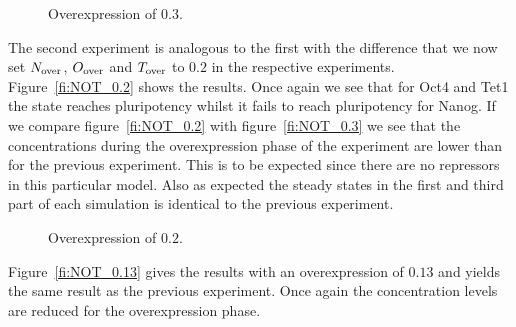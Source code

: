 \begin{figure}
\centering
\begin{minipage}[t]{0.3\textwidth}
\centering
\graphicspath{{../Plots/}}

\end{minipage}
\hfill
\begin{minipage}[t]{0.3\textwidth}
\centering
\graphicspath{{../Plots/}}

\end{minipage}
\hspace*{0.2cm}
\begin{minipage}[t]{0.3\textwidth}
\centering
\graphicspath{{../Plots/}}

\end{minipage}
\caption{Overexpression of $0.3$.}
\label{pl:NOT_0.3}
\end{figure}

The second experiment is analogous to the first with the difference that we now set
$N_\text{over}$, $O_\text{over}$ and $T_\text{over}$ to $0.2$ in the respective experiments. Figure~\ref{fi:NOT_0.2} 
shows the results. Once again we see that
for Oct4 and Tet1 the state reaches pluripotency whilst it fails to reach pluripotency for Nanog.
If we compare figure~\ref{fi:NOT_0.2} with figure~\ref{fi:NOT_0.3} we see that the concentrations
during the overexpression phase of the experiment are lower than for the previous experiment.
This is to be expected since there are no repressors in this particular model.
Also as expected the steady states in the first and third part of each simulation is identical to
the previous experiment.

\begin{figure}
\centering
\begin{minipage}[t]{0.3\textwidth}
\centering
\graphicspath{{../Plots/}}

\end{minipage}
\hfill
\begin{minipage}[t]{0.3\textwidth}
\centering
\graphicspath{{../Plots/}}

\end{minipage}
\hspace*{0.2cm}
\begin{minipage}[t]{0.3\textwidth}
\centering
\graphicspath{{../Plots/}}

\end{minipage}
\caption{Overexpression of $0.2$.}
\label{pl:NOT_0.2}
\end{figure}

Figure~\ref{fi:NOT_0.13} gives the results with an overexpression of $0.13$ and yields the same result as the previous
experiment. Once again the concentration levels are reduced for the overexpression phase.


